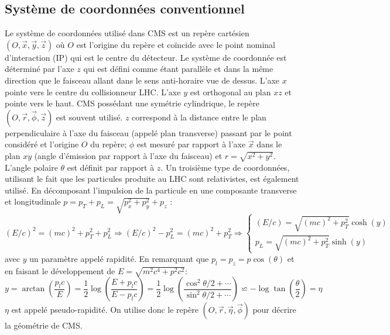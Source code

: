 \subsection{Système de coordonnées conventionnel}
Le système de coordonnées utilisé dans CMS est un repère cartésien $\left(O,\vec{x},\vec{y},\vec{z}\right)$ où $O$ est l'origine du repère et coïncide avec le point nominal d'interaction (IP) qui est le centre du détecteur. Le système de coordonnée est déterminé par l'axe $z$ qui est défini comme étant parallèle et dans la même direction que le faisceau allant dans le sens anti-horaire vue de dessus. L'axe $x$ pointe vers le centre du collisionneur LHC. L'axe $y$ est orthogonal au plan $xz$ et pointe vers le haut. CMS possédant une symétrie cylindrique, le repère $\left(O,\vec{r},\vec{\phi},\vec{z}\right)$ est souvent utilisé. $z$ correspond à la distance entre le plan perpendiculaire à l'axe du faisceau (appelé plan transverse) passant par le point considéré et l'origine $O$ du repère; $\phi$ est mesuré par rapport à l'axe $\vec{x}$ dans le plan $xy$ (angle d'émission par rapport à l'axe du faisceau) et $r=\sqrt{x^2+y^2}$. L'angle polaire $\theta$ est définit par rapport à $z$. Un troisième type de coordonnées, utilisant le fait que les particules produite au LHC sont relativistes, est également utilisé. En décomposant l'impulsion de la particule en une composante transverse et longitudinale $p=p_{T}+p_{L}=\sqrt{p_{x}^{2}+p_{y}^{2}}+p_{z}$ :
\begin{equation}
(E/c)^{2}=(mc)^{2}+p_{T}^{2}+p_{L}^{2}\Longrightarrow (E/c)^{2}-p_{L}^{2}=(mc)^{2}+p_{T}^{2}\Longrightarrow  \begin{cases}
\left(E/c \right)=\sqrt{\left(mc \right)^{2}+p_{T}^{2}}\cosh(y) \\
p_{L}=\sqrt{\left(mc \right)^{2}+p_{T}^{2}}\sinh(y)
\end{cases}
\end{equation}
avec $y$ un paramètre appelé rapidité. En remarquant que $p_{l}=p_{z}=p\cos(\theta)$ et en faisant le développement de $E=\sqrt{m^{2}c^{4}+p^{2}c^{2}}$:
\begin{equation}
y=\arctan\left(\frac{p_{l}c}{E}\right)=\frac{1}{2}\log\left(\frac{E+p_{l}c}{E-p_{l}c}\right)=\frac{1}{2}\log\left(\frac{\cos^2 \theta/2+\cdots}{\sin^2 \theta/2+\cdots}\right)\backsimeq-\log\tan\left(\frac{\theta}{2}\right)=\eta
\end{equation}
$\eta$ est appelé pseudo-rapidité. On utilise donc le repère $\left(O,\vec{r},\vec{\eta},\vec{\phi}\right)$ pour décrire la géométrie de CMS.

